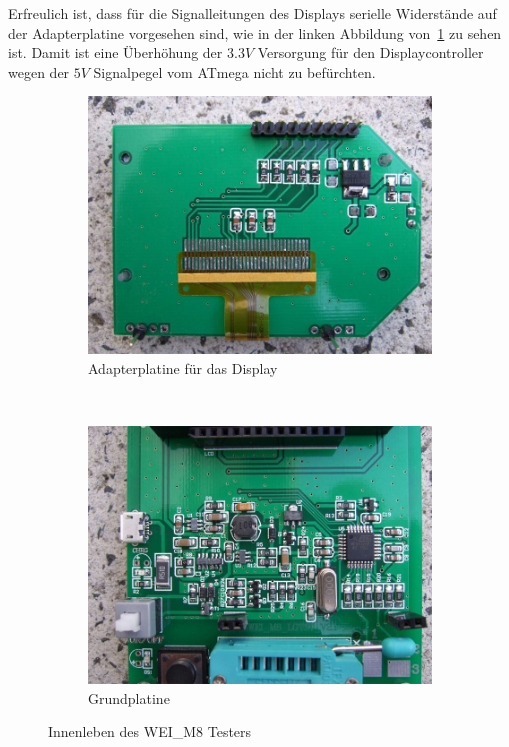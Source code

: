 Erfreulich ist, dass für die Signalleitungen des Displays serielle Widerstände
auf der Adapterplatine vorgesehen sind, wie in der linken Abbildung von~\ref{fig:WeiM8int}
zu sehen ist. Damit ist eine Überhöhung der \(3.3V\) Versorgung für den Displaycontroller
wegen der \(5V\) Signalpegel vom ATmega nicht zu befürchten.

\begin{figure}[H]
  \begin{subfigure}[b]{.5\textwidth}	%
    \centering
    \includegraphics[width=1.\textwidth]{../PNG/WEI_M8_D.JPG}	%
    \caption{Adapterplatine für das Display}
  \end{subfigure}
~
  \begin{subfigure}[b]{.5\textwidth}	%
    \centering
    \includegraphics[width=1.\textwidth]{../PNG/WEI_M8_L.JPG}	%
    \caption{Grundplatine}
  \end{subfigure}
  \caption{Innenleben des WEI\_M8 Testers}
\label{fig:WeiM8int}
\end{figure}


